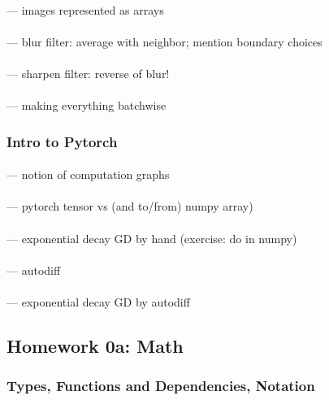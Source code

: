 \documentclass[12pt]{article}
\begin{document}
        \paragraph{\sf} --- images represented as arrays
        \paragraph{\sf} --- blur filter: average with neighbor; mention boundary choices
        \paragraph{\sf} --- sharpen filter: reverse of blur!
        \paragraph{\sf} --- making everything batchwise

      \subsubsection*{Intro to Pytorch}
        \paragraph{\sf} --- notion of computation graphs
        \paragraph{\sf} --- pytorch tensor vs (and to/from) numpy array)
        \paragraph{\sf} --- exponential decay GD by hand (exercise: do in numpy)
        \paragraph{\sf} --- autodiff
        \paragraph{\sf} --- exponential decay GD by autodiff

    \newpage

    \subsection*{Homework 0a: Math}
      \subsubsection*{Types, Functions and Dependencies, Notation}
\end{document}
